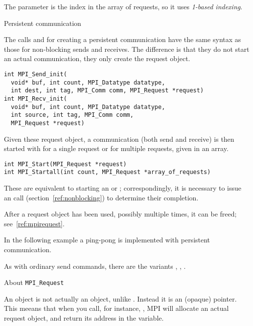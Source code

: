 \begin{fortrannote}
  The  parameter is the index in the array of requests,
  so it uses \emph{1-based indexing}.
\end{fortrannote}

 {Persistent communication}

The calls  and 
for creating a persistent communication have the same syntax as 
those for non-blocking sends and receives. The difference is that they do not start
an actual communication, they only create the request object.
\begin{verbatim}
int MPI_Send_init(
  void* buf, int count, MPI_Datatype datatype, 
  int dest, int tag, MPI_Comm comm, MPI_Request *request) 
int MPI_Recv_init(
  void* buf, int count, MPI_Datatype datatype, 
  int source, int tag, MPI_Comm comm, 
  MPI_Request *request)
\end{verbatim}

Given these request object, a communication (both send and receive) is then started
with  for a single request or  for 
multiple requests, given in an array.
\begin{verbatim}
int MPI_Start(MPI_Request *request)
int MPI_Startall(int count, MPI_Request *array_of_requests) 
\end{verbatim}
These are equivalent to starting an  or ; correspondingly, 
it is necessary to issue an  call (section~\ref{ref:nonblocking})
to determine their completion.

After a request object has been used, possibly multiple times, it can be freed; see~\ref{ref:mpirequest}.

In the following example a ping-pong is implemented with persistent communication.

As with ordinary send commands, there are the variants
,
,
.


 {About \texttt{MPI\_Request}}
\label{ref:mpirequest}

An  object is not actually an object,
unlike . Instead it is an (opaque) pointer.
This meeans that when you call, for instance, ,
MPI will allocate an actual request object, and return its
address in the  variable.


